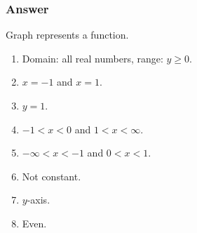 \documentclass[11pt, letterpaper, oneside]{memoir}
\begin{document}
\subsubsection*{Answer}

Graph represents a function.

\begin{enumerate}[label=(\alph*)]
  \item Domain: all real numbers, range: $ y \ge 0 $.
  \item $ x = -1 $ and $ x = 1 $.
  \item $ y = 1 $.
  \item $ -1 < x < 0 $ and $ 1 < x < \infty $.
  \item $ -\infty < x < -1 $ and $ 0 < x < 1 $.
  \item Not constant.
  \item $ y $-axis.
  \item Even.
\end{enumerate}






\end{document}
